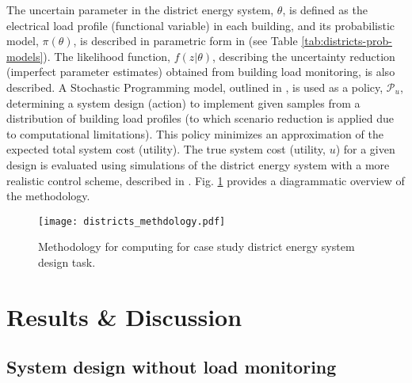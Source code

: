 The uncertain parameter in the district energy system, $\theta$, is defined as the electrical load profile (functional variable) in each building, and its probabilistic model, $\pi(\theta)$, is described in parametric form in  (see Table \ref{tab:districts-prob-models}). The likelihood function, $f(z|\theta)$, describing the uncertainty reduction (imperfect parameter estimates) obtained from building load monitoring, is also described.
A Stochastic Programming model, outlined in , is used as a policy, $\mathcal{P}_u$, determining a system design (action) to implement given samples from a distribution of building load profiles (to which scenario reduction is applied due to computational limitations). This policy minimizes an approximation of the expected total system cost (utility). The true system cost (utility, $u$) for a given design is evaluated using simulations of the district energy system with a more realistic control scheme, described in . Fig. \ref{fig:districts-method} provides a diagrammatic overview of the methodology.

\begin{figure}[p]
    \centering
    \texttt{[image: districts\_methdology.pdf]}
    \caption{Methodology for computing  for case study district energy system design task.}
    \label{fig:districts-method}
\end{figure}


\newpage
\section{Results \& Discussion} \label{sec:districts-results}

\subsection{System design without load monitoring} \label{sec:districts-prior-design}



